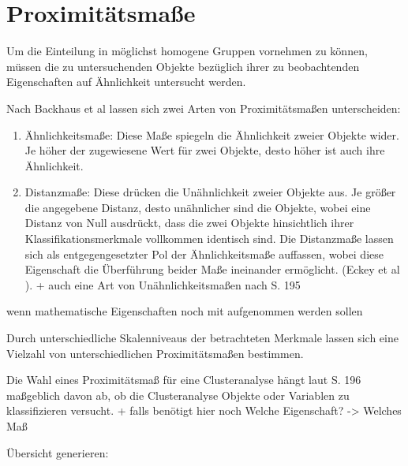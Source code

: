\chapter{Proximitätsmaße}

Um die Einteilung in möglichst homogene Gruppen vornehmen zu können, müssen die zu untersuchenden Objekte bezüglich ihrer zu beobachtenden Eigenschaften auf Ähnlichkeit untersucht werden. 

Nach Backhaus et al \cite{Backhaus.2016} lassen sich zwei Arten von Proximitätsmaßen unterscheiden:

\begin{enumerate}
	\item Ähnlichkeitsmaße: Diese Maße spiegeln die Ähnlichkeit zweier Objekte wider. Je höher der zugewiesene Wert für zwei Objekte, desto höher ist auch ihre Ähnlichkeit.
	\item Distanzmaße: Diese drücken die Unähnlichkeit zweier Objekte aus. Je größer die angegebene Distanz, desto unähnlicher sind die Objekte, wobei eine Distanz von Null ausdrückt, dass die zwei Objekte hinsichtlich ihrer Klassifikationsmerkmale vollkommen identisch sind. Die Distanzmaße lassen sich als entgegengesetzter Pol der Ähnlichkeitsmaße auffassen, wobei diese Eigenschaft die Überführung beider Maße ineinander ermöglicht. (Eckey et al \cite{Eckey.2002}). + auch eine Art von Unähnlichkeitsmaßen nach \cite{Bacher.2010} S. 195
\end{enumerate}

\cite{Eckey.2002} wenn mathematische Eigenschaften noch mit aufgenommen werden sollen

Durch unterschiedliche Skalenniveaus der betrachteten Merkmale lassen sich eine Vielzahl von unterschiedlichen Proximitätsmaßen bestimmen.

Die Wahl eines Proximitätsmaß für eine Clusteranalyse hängt laut \cite{Bacher.2010} S. 196 maßgeblich davon ab, ob die Clusteranalyse Objekte oder Variablen zu klassifizieren versucht. + falls benötigt hier noch Welche Eigenschaft? -> Welches Maß

Übersicht generieren: 

